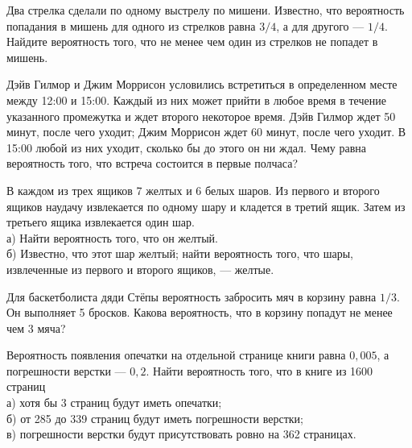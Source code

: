 \newpage\setcounter{zad}{0}



\begin{zkrW}{20}\noindent 
	Два стрелка сделали по одному выстрелу по мишени. Известно, что вероятность попадания в мишень для одного из стрелков равна $3/4$, а для другого --- $1/4$. Найдите вероятность того, что не менее чем один из стрелков не попадет в мишень.
 
\end{zkrW}

\begin{zkrW}{20}\noindent 
	Дэйв Гилмор и Джим Моррисон условились встретиться в определенном месте между 12:00 и 15:00. Каждый из них может прийти в любое время в течение указанного промежутка и ждет второго некоторое время. Дэйв Гилмор ждет 50 минут, после чего уходит; Джим Моррисон ждет 60 минут, после чего уходит. В 15:00 любой из них уходит, сколько бы до этого он ни ждал. Чему равна вероятность того, что встреча состоится в первые полчаса?
 
\end{zkrW}

\begin{zkrW}{20}\noindent 
	В каждом из трех ящиков 7 желтых и 6 белых шаров. Из первого и второго ящиков наудачу извлекается по одному шару и кладется в третий ящик. Затем из третьего ящика извлекается один шар. \\ \indent а) Найти вероятность того, что он желтый. \\ \indent б) Известно, что этот шар желтый; найти вероятность того, что шары, извлеченные из первого и второго ящиков, --- желтые.
 
\end{zkrW}

\begin{zkrW}{20}\noindent 
	Для баскетболиста дяди Стёпы вероятность забросить мяч в корзину равна $1/3$. Он выполняет 5 бросков. Какова вероятность, что в корзину попадут не менее чем 3 мяча?
 
\end{zkrW}

\begin{zkrW}{20}\noindent 
	Вероятность появления опечатки на отдельной странице книги равна $0{,}005$, а погрешности верстки --- $0{,}2$. Найти вероятность того, что в книге из 1600 страниц \\ \indent а) хотя бы 3 страниц будут иметь опечатки; \\ \indent б) от 285 до 339 страниц будут иметь погрешности верстки; \\ \indent в) погрешности верстки будут присутствовать ровно на 362 страницах.
 
\end{zkrW}

